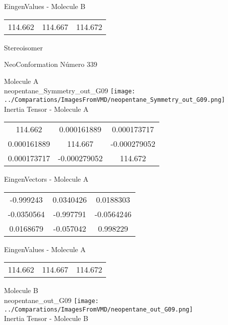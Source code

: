 \begin{multicols}{2}
\begin{center}
\vtab
 EingenValues - Molecule B     \\
\vtab
\begin{tabular}{|c c c|}
114.662	 & 	114.667	 & 	114.672	 \\
\end{tabular}

\end{center}
\end{multicols}
\begin{center}
\vtab
\vtab
\textcolor{NavyBlue}{\Large Stereoisomer}
\end{center}

 \newpage

\vtab[-2cm]
\begin{center}
{\large NeoConformation \tab Número 339}
\end{center}
\begin{multicols}{2}
\begin{center}

Molecule A \\ 
neopentane\_Symmetry\_out\_G09
\texttt{[image: ../Comparations/ImagesFromVMD/neopentane\_Symmetry\_out\_G09.png]}
\\
Inertia Tensor - Molecule A \\
\vtab

\begin{tabular}{|c c c|}
114.662	 & 	0.000161889	 & 	0.000173717	 \\
0.000161889	 & 	114.667	 & 	-0.000279052	 \\
0.000173717	 & 	-0.000279052	 & 	114.672
\end{tabular}

\vtab
 EingenVectors - Molecule A     \\
\vtab
\begin{tabular}{|c c c|}
-0.999243	 & 	0.0340426	 & 	0.0188303	 \\
-0.0350564	 & 	-0.997791	 & 	-0.0564246	 \\
0.0168679	 & 	-0.057042	 & 	0.998229
\end{tabular}

\vtab
 EingenValues - Molecule A     \\
\vtab
\begin{tabular}{|c c c|}
114.662	 & 	114.667	 & 	114.672	 \\
\end{tabular}
\columnbreak

Molecule B \\ 
neopentane\_out\_G09
\texttt{[image: ../Comparations/ImagesFromVMD/neopentane\_out\_G09.png]}
\\
Inertia Tensor - Molecule B \\
\vtab


\end{center}
\end{multicols}

